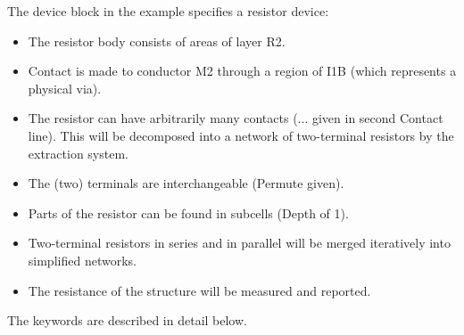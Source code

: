 The device block in the example specifies a resistor device:
\begin{itemize}
\item{The resistor body consists of areas of layer {\vt R2}.}
\item{Contact is made to conductor {\vt M2} through a region of
  {\vt I1B} (which represents a physical via).}
\item{The resistor can have arbitrarily many contacts ({\vt ...}
  given in second {\vt Contact} line).  This will be decomposed
  into a network of two-terminal resistors by the extraction system.}
\item{The (two) terminals are interchangeable ({\vt Permute} given).}
\item{Parts of the resistor can be found in subcells ({\vt Depth} of 1).}
\item{Two-terminal resistors in series and in parallel will be merged
 iteratively into simplified networks.}
\item{The resistance of the structure will be measured and reported.}
\end{itemize}

The keywords are described in detail below.

